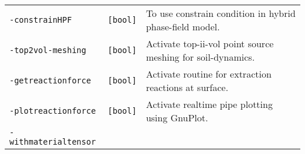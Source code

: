 \begin{longtable}[]{@{}lll@{}}
\begin{minipage}[t]{0.26\columnwidth}\raggedright\strut
\lstinline!-constrainHPF!\strut
\end{minipage} & \begin{minipage}[t]{0.09\columnwidth}\raggedright\strut
\lstinline![bool]!\strut
\end{minipage} & \begin{minipage}[t]{0.56\columnwidth}\raggedright\strut
To use constrain condition in hybrid phase-field model.\strut
\end{minipage}\tabularnewline
\begin{minipage}[t]{0.26\columnwidth}\raggedright\strut
\lstinline!-top2vol-meshing!\strut
\end{minipage} & \begin{minipage}[t]{0.09\columnwidth}\raggedright\strut
\lstinline![bool]!\strut
\end{minipage} & \begin{minipage}[t]{0.56\columnwidth}\raggedright\strut
Activate top-ii-vol point source meshing for soil-dynamics.\strut
\end{minipage}\tabularnewline
\begin{minipage}[t]{0.26\columnwidth}\raggedright\strut
\lstinline!-getreactionforce!\strut
\end{minipage} & \begin{minipage}[t]{0.09\columnwidth}\raggedright\strut
\lstinline![bool]!\strut
\end{minipage} & \begin{minipage}[t]{0.56\columnwidth}\raggedright\strut
Activate routine for extraction reactions at surface.\strut
\end{minipage}\tabularnewline
\begin{minipage}[t]{0.26\columnwidth}\raggedright\strut
\lstinline!-plotreactionforce!\strut
\end{minipage} & \begin{minipage}[t]{0.09\columnwidth}\raggedright\strut
\lstinline![bool]!\strut
\end{minipage} & \begin{minipage}[t]{0.56\columnwidth}\raggedright\strut
Activate realtime pipe plotting using GnuPlot.\strut
\end{minipage}\tabularnewline
\begin{minipage}[t]{0.26\columnwidth}\raggedright\strut
\lstinline!-withmaterialtensor!\strut
\end{minipage} & \begin{minipage}[t]{0.09\columnwidth}\raggedright\strut

\end{minipage}
\end{longtable}
